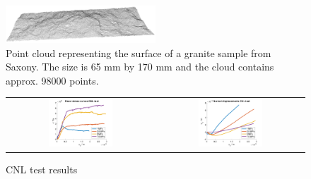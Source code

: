 \begin{figure}[!ht]
\begin{center}
\includegraphics[width=0.5\textwidth]{./figures/MEX7_Point_cloud.png}
\end{center}
\caption{Point cloud representing the surface of a granite sample from Saxony. The size is 65 mm by 170 mm and the cloud contains approx. 98000 points.}
\label{fig:DataCNLGranitePointCloud}
\end{figure}

\begin{figure}[!ht]
\begin{tabular}{cc}
\includegraphics[width=0.45\textwidth]{./figures/CNLShearCurvesAll.png}     
& 
\includegraphics[width=0.45\textwidth]{./figures/CNLDilatationAll.png} 
\end{tabular}
\caption{CNL test results}
\label{fig:DataCNLGraniteLab}
\end{figure}


